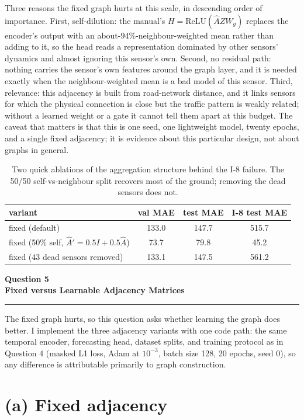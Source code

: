 \documentclass[11pt,letterpaper]{article}
\newcommand{\taskbanner}[2]{\begin{center}{\small\bfseries #1}\\[3pt]{\Large\bfseries #2}\end{center}\vspace{2pt}\hrule\vspace{8pt}}
\begin{document}
Three reasons the fixed graph hurts at this scale, in descending order of importance.
First, self-dilution: the manual's $H = \mathrm{ReLU}(\hat{A} Z W_g)$ replaces the encoder's
output with an about-$94\%$-neighbour-weighted mean rather than adding to it, so the head
reads a representation dominated by other sensors' dynamics and almost ignoring this sensor's
own. Second, no residual path: nothing carries the sensor's own features around the graph
layer, and it is needed exactly when the neighbour-weighted mean is a bad model of this
sensor. Third, relevance: this adjacency is built from road-network distance, and it links
sensors for which the physical connection is close but the traffic pattern is weakly related;
without a learned weight or a gate it cannot tell them apart at this budget.
The caveat that matters is that this is one seed, one lightweight model, twenty epochs, and
a single fixed adjacency; it is evidence about {this} particular design, not about graphs in
general.

\begin{table}[htbp]
\centering
\footnotesize
\begin{tabular}{@{}lccc@{}}
\toprule
\textbf{variant} & \textbf{val MAE} & \textbf{test MAE} & \textbf{I-8 test MAE} \\
\midrule
fixed (default) & 133.0 & 147.7 & 515.7 \\
fixed (50\% self, $\hat{A}' = 0.5 I + 0.5 \hat{A}$) & 73.7 & 79.8 & 45.2 \\
fixed (43 dead sensors removed) & 133.1 & 147.5 & 561.2 \\
\bottomrule
\end{tabular}
\caption{Two quick ablations of the aggregation structure behind the I-8 failure. The
50/50 self-vs-neighbour split recovers most of the ground; removing the dead sensors does
not.}
\label{tab:ablation}
\end{table}

\newpage


\taskbanner{Question 5}{Fixed versus Learnable Adjacency Matrices}

The fixed graph hurts, so this question asks whether learning the graph does better. I
implement the three adjacency variants with one code path: the same temporal encoder,
forecasting head, dataset splits, and training protocol as in Question 4 (masked L1 loss,
Adam at $10^{-3}$, batch size 128, 20 epochs, seed 0), so any difference is attributable
primarily to graph construction.

\section*{(a) Fixed adjacency}
\end{document}
